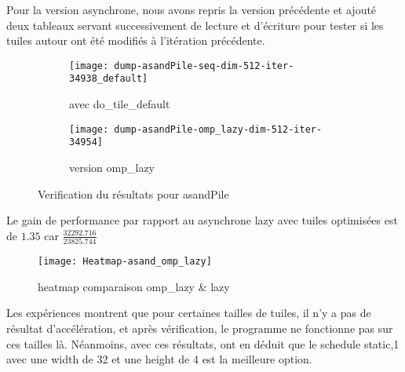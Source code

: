 \documentclass[10pt, a4paper]{article}
\begin{document}
Pour la version asynchrone, nous avons repris la version précédente et ajouté deux tableaux
servant successivement de lecture et d'écriture pour tester si les tuiles autour ont été modifiés à l'itération précédente.

\begin{figure}[H]
    \centering
    \begin{subfigure}{.4\textwidth}
        \texttt{[image: dump-asandPile-seq-dim-512-iter-34938\_default]}
        \caption{\small{avec do\_tile\_default}}
    \end{subfigure}
    \begin{subfigure}{.4\textwidth}
        \texttt{[image: dump-asandPile-omp\_lazy-dim-512-iter-34954]}
        \caption{\small{version omp\_lazy}}
    \end{subfigure}
    \caption{Verification du résultats pour asandPile}
\end{figure}

Le gain de performance par rapport au asynchrone lazy avec tuiles optimisées est de $1.35$ car $\frac{32292.716}{23825.744}$

\begin{figure}[H]
    \centering
    \texttt{[image: Heatmap-asand\_omp\_lazy]}
    \caption{\small{heatmap comparaison omp\_lazy \& lazy}}
\end{figure}

Les expériences montrent que pour certaines tailles de tuiles, il n'y a pas de résultat d'accélération, et après vérification, le programme ne fonctionne pas sur ces tailles là.
Néanmoins, avec ces résultats, ont en déduit que le schedule static,1 avec une width de 32 et une height de 4 est la meilleure option.
\end{document}
